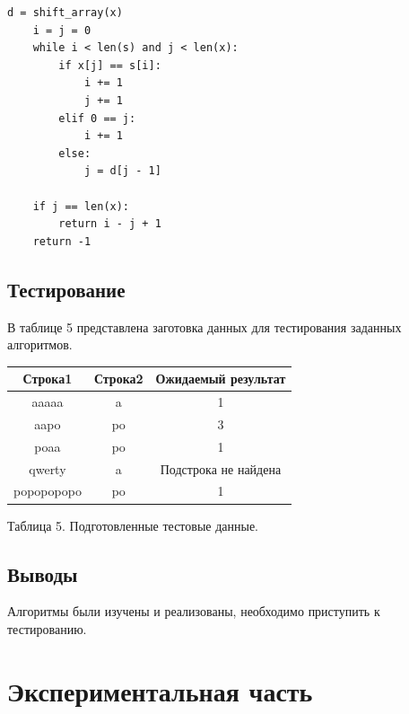 \documentclass[a4paper,14pt]{article} %
\begin{document}
\begin{lstlisting}[caption=Алгоритм Бойера - Мура]
    d = shift_array(x)
    i = j = 0
    while i < len(s) and j < len(x):
        if x[j] == s[i]:
            i += 1
            j += 1
        elif 0 == j:
            i += 1
        else:
            j = d[j - 1]

    if j == len(x):
        return i - j + 1
    return -1
\end{lstlisting}

\subsection{Тестирование}
	\hfill
	
	В таблице 5 представлена заготовка данных для тестирования заданных алгоритмов. 
	\begin{center}
		\begin{tabular}{  | c | c | c | }
			\hline
			\textbf{Строка1} & \textbf{Строка2} & \textbf{Ожидаемый результат} \\ \hline
   			aaaaa&a&1 \\ \hline
			
   			aapo & po & 3 \\ \hline
			
			poaa & po & 1 \\ \hline
			
			qwerty & a & Подстрока не найдена \\ \hline
			
			popopopopo & po & 1 \\ \hline
			
		\end{tabular}
		
		\hfill
		
		Таблица 5.
		Подготовленные тестовые данные.  
	\end{center}
        
	
 	\subsection{Выводы}
	\hfill
	
	Алгоритмы были изучены и реализованы, необходимо приступить к тестированию. 
        
        \newpage
        

        \section{Экспериментальная часть}
        \hfill
        
\end{document}
